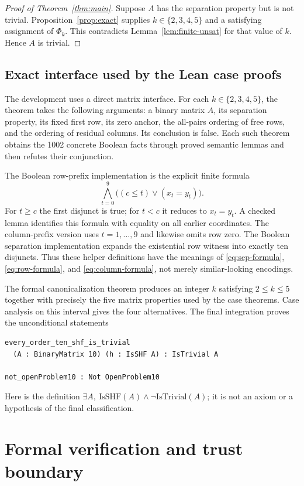 \documentclass[11pt]{article}
\theoremstyle{definition}
\theoremstyle{remark}
\begin{document}
\begin{proof}[Proof of Theorem~\ref{thm:main}]
Suppose $A$ has the separation property but is not trivial.
Proposition~\ref{prop:exact} supplies $k\in\{2,3,4,5\}$ and a
satisfying assignment of $\Phi_k$. This contradicts
Lemma~\ref{lem:finite-unsat} for that value of $k$. Hence $A$ is trivial.
\end{proof}

\subsection{Exact interface used by the Lean case proofs}
The development uses a direct matrix interface. For each
$k\in\{2,3,4,5\}$, the theorem
 takes the following arguments: a binary matrix
$A$, its separation property, its fixed first row, its zero anchor,
the all-pairs ordering of free rows, and the ordering of residual
columns. Its conclusion is false. Each such theorem obtains the
1002 concrete Boolean facts through proved semantic lemmas and then
refutes their conjunction.

The Boolean row-prefix implementation is the explicit finite formula
\[
 \bigwedge_{t=0}^{9}\bigl((c\leq t)\vee(x_t=y_t)\bigr).
\]
For $t\geq c$ the first disjunct is true; for $t<c$ it reduces to
$x_t=y_t$. A checked lemma identifies this formula with equality on
all earlier coordinates. The column-prefix version uses $t=1,\ldots,9$
and likewise omits row zero. The Boolean separation implementation
expands the existential row witness into exactly ten disjuncts. Thus
these helper definitions have the meanings of
\eqref{eq:sep-formula}, \eqref{eq:row-formula}, and
\eqref{eq:column-formula}, not merely similar-looking encodings.

The formal canonicalization theorem produces an integer $k$ satisfying
$2\leq k\leq5$ together with precisely the five matrix properties
used by the case theorems. Case analysis on this interval gives the
four alternatives. The final integration proves the unconditional statements
\begin{verbatim}
every_order_ten_shf_is_trivial
  (A : BinaryMatrix 10) (h : IsSHF A) : IsTrivial A

not_openProblem10 : Not OpenProblem10
\end{verbatim}
Here  is the definition
$\exists A,\ \mathrm{IsSHF}(A)\wedge\neg\mathrm{IsTrivial}(A)$;
it is not an axiom or a hypothesis of the final classification.

\section{Formal verification and trust boundary}
\label{sec:trust}
\end{document}

